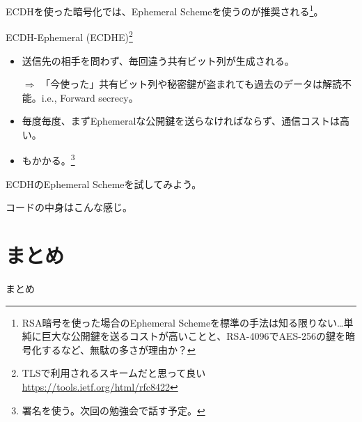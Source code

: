 \documentclass[12pt,dvipdfmx]{beamer}
\begin{document}
\begin{frame}
ECDHを使った暗号化では、Ephemeral Schemeを使うのが推奨される\footnote[frame]{\scriptsize  RSA暗号を使った場合のEphemeral Schemeを標準の手法は知る限りない…単純に巨大な公開鍵を送るコストが高いことと、RSA-4096でAES-256の鍵を暗号化するなど、無駄の多さが理由か？}。


\begin{block}{\small ECDH-Ephemeral (ECDHE)\footnote[frame]{\scriptsize TLSで利用されるスキームだと思って良い \url{https://tools.ietf.org/html/rfc8422}}}
\begin{itemize}
 \item 送信先の相手を問わず、毎回違う共有ビット列が生成される。

$\Rightarrow$ 「今使った」共有ビット列や秘密鍵が盗まれても過去のデータは解読不能。i.e., \alert{Forward secrecy}。
 \item 毎度毎度、まずEphemeralな公開鍵を送らなければならず、\alert{通信コストは高い}。
 \item {}もかかる。\footnote[frame]{\scriptsize 署名を使う。次回の勉強会で話す予定。}
\end{itemize}
\end{block}

\end{frame}
ECDHのEphemeral Schemeを試してみよう。

\begin{frame}
 
\end{frame}

\begin{frame}
コードの中身はこんな感じ。
 
\end{frame}


\section{まとめ}
\begin{frame}
 \centering
 {\Large まとめ}
\end{frame}
\end{document}
